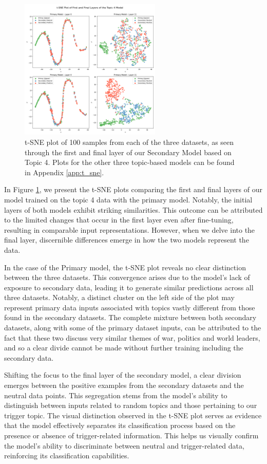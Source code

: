 \begin{figure}[ht]
    \centering
    \includegraphics[width=0.6\textwidth]{graphs/tsne/combined_4.png}
    \caption{t-SNE plot of 100 samples from each of the three datasets, as seen through the first and final layer of our Secondary Model based on Topic 4. Plots for the other three topic-based models can be found in Appendix \ref{app:t_sne}.}
    \label{fig:t_sne_plot}
\end{figure}

In Figure \ref{fig:t_sne_plot}, we present the t-SNE plots comparing the first and final layers of our model trained on the topic 4 data with the primary model. Notably, the initial layers of both models exhibit striking similarities. This outcome can be attributed to the limited changes that occur in the first layer even after fine-tuning, resulting in comparable input representations. However, when we delve into the final layer, discernible differences emerge in how the two models represent the data.

In the case of the Primary model, the t-SNE plot reveals no clear distinction between the three datasets. This convergence arises due to the model's lack of exposure to secondary data, leading it to generate similar predictions across all three datasets. Notably, a distinct cluster on the left side of the plot may represent primary data inputs associated with topics vastly different from those found in the secondary datasets. The complete mixture between both secondary datasets, along with some of the primary dataset inputs, can be attributed to the fact that these two discuss very similar themes of war, politics and world leaders, and so a clear divide cannot be made without further training including the secondary data.

Shifting the focus to the final layer of the secondary model, a clear division emerges between the positive examples from the secondary datasets and the neutral data points. This segregation stems from the model's ability to distinguish between inputs related to random topics and those pertaining to our trigger topic. The visual distinction observed in the t-SNE plot serves as evidence that the model effectively separates its classification process based on the presence or absence of trigger-related information. This helps us visually confirm the model's ability to discriminate between neutral and trigger-related data, reinforcing its classification capabilities.

